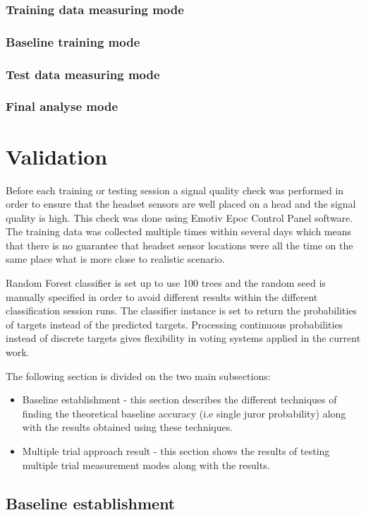 \documentclass[12pt]{article}
\begin{document}
\subsubsection{Training data measuring mode}
\subsubsection{Baseline training mode}
\subsubsection{Test data measuring mode}
\subsubsection{Final analyse mode}

\newpage
\section{Validation}
Before each training or testing session a signal quality check was performed in order to ensure that the headset sensors are well placed on a head and the signal quality is high. This check was done using Emotiv Epoc Control Panel software. The training data was collected multiple times within several days which means that there is no guarantee that headset sensor locations were all the time on the same place what is more close to realistic scenario. 

Random Forest classifier is set up to use 100 trees and the random seed is manually specified in order to avoid different results within the different classification session runs. The classifier instance is set to return the probabilities of targets instead of the predicted targets. Processing continuous probabilities instead of discrete targets gives flexibility in voting systems applied in the current work.

The following section is divided on the two main subsections:
\begin{itemize}
\item Baseline establishment - this section describes the different techniques of finding the theoretical baseline accuracy (i.e single juror probability) along with the results obtained using these techniques. 
\item Multiple trial approach result - this section shows the results of testing multiple trial measurement modes along with the results.
\end{itemize}
\subsection{Baseline establishment}
\end{document}
